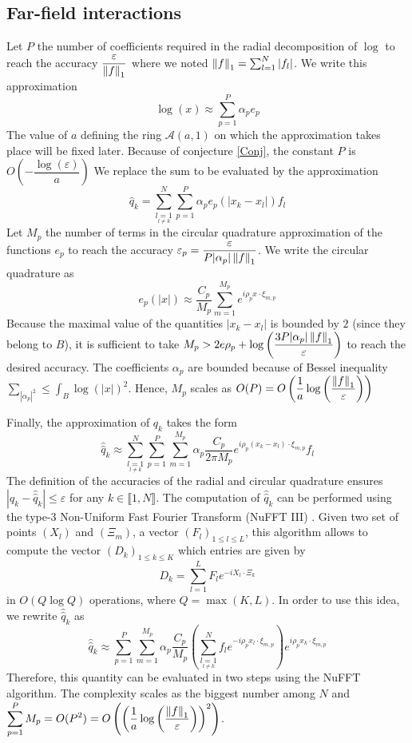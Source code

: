 \documentclass[11pt,a4paper]{article}
\begin{document}
\subsection{Far-field interactions}
Let $P$ the number of coefficients required in the radial decomposition of $\log$ to reach the accuracy $\dfrac{\varepsilon}{\left\|f\right\|_1}$ where we noted $\left\|f\right\|_1 = \sum_{l=1}^{N}{|f_l|}$. We write this approximation
\[ \log(x) \approx \sum_{p=1}^P \alpha_p e_p\]
The value of $a$ defining the ring $\mathcal{A}(a,1)$ on which the approximation takes place will be fixed later. Because of conjecture \ref{Conj}, the constant $P$ is $O\left(-\dfrac{\log(\varepsilon)}{a}\right)$
We replace the sum to be evaluated by the approximation 
\[ \hat{q}_k =  \sum_{\underset{l\neq k}{l=1}}^N\sum_{p=1}^P \alpha_p e_p(|x_k - x_l|)f_l\]  
Let $M_p$ the number of terms in the circular quadrature approximation of the functions $e_p$ to reach the accuracy $\varepsilon_p = \dfrac{\varepsilon}{P |\alpha_p|\left\|f\right\|_1}$. We write the circular quadrature as 
\[ e_p(|x|) \approx \dfrac{C_p}{M_p}\sum_{m=1}^{M_p} {e^{i \rho_px \cdot \xi_{m,p}}}\]
Because the maximal value of the quantities $|x_k - x_l|$ is bounded by $2$ (since they belong to $B$), it is sufficient to take $M_p > 2e \rho_p + \log\left(\dfrac{3P |\alpha_p|\left\|f\right\|_1}{\varepsilon}\right)$ to reach the desired accuracy. The coefficients $\alpha_p$ are bounded because of Bessel inequality $\sum_{|\alpha_p|^2} \leq \int_{B} \log(|x|)^2$. Hence, $M_p$ scales as $O(P) = O\left(\dfrac{1}{a}\log\left(\dfrac{\left\|f\right\|_1}{\varepsilon}\right)\right)$

Finally, the approximation of $q_k$ takes the form 
\[\hat{\hat{q}}_k \approx \sum_{\underset{l\neq k}{l=1}}^N\sum_{p=1}^P\sum_{m=1}^{M_p}{ \alpha_p \dfrac{C_p}{2\pi {M_p}}e^{i \rho_p (x_k - x_l) \cdot \xi_{m,p}}}f_l \]
The definition of the accuracies of the radial and circular quadrature ensures $|q_k - \hat{\hat{q}}_k| \leq \varepsilon$ for any $k \in \llbracket 1,N\rrbracket$. 
The computation of $\hat{\hat{q}}_k$ can be performed using the type-3 Non-Uniform Fast Fourier Transform (NuFFT III) \cite{NuFFT}. Given two set of points $(X_l)$ and $(\Xi_m)$, a vector $(F_l)_{1 \leq l \leq L}$, this algorithm allows to compute the vector $\left(D_k\right)_{1\leq k \leq K}$ which entries are given by
\[ D_k = \sum_{l=1}^L F_l e^{-i X_l \cdot \Xi_k}\]
in $O(Q \log Q)$ operations, where $Q = \max(K,L)$. In order to use this idea, we rewrite $\hat{\hat{q}}_k$ as 
\[\hat{\hat{q}}_k \approx \sum_{p=1}^P\sum_{m=1}^{M_p}{ \alpha_p \dfrac{C_p}{ M_p} \left(\sum_{\underset{l\neq k}{l=1}}^N f_le^{-i \rho_p x_l \cdot \xi_{m,p}} \right) e^{i \rho_p x_k \cdot \xi_{m,p}}} \]
Therefore, this quantity can be evaluated in two steps using the NuFFT algorithm. The complexity scales as the biggest number among $N$ and $\displaystyle \sum_{p=1}^P M_p = O(P^2) = O\left(\left(\dfrac{1}{a}\log\left(\dfrac{\left\|f\right\|_1}{\varepsilon}\right)\right)^2\right)$.  
\end{document}
